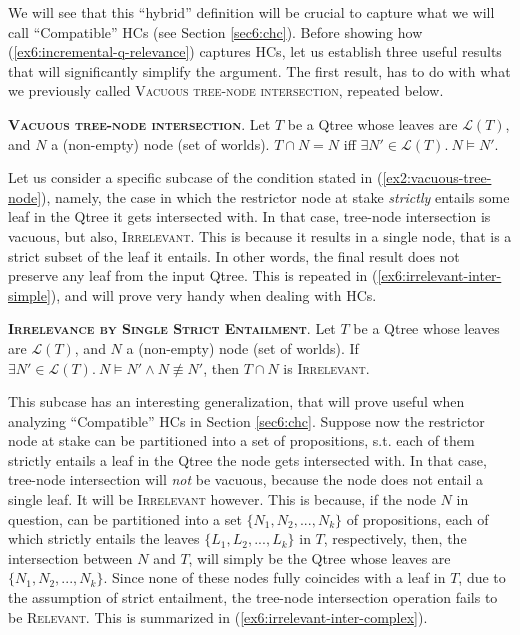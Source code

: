 We will see that this ``hybrid'' definition will be crucial to capture what we will call ``Compatible'' HCs (see Section \ref{sec6:chc}). Before showing how (\ref{ex6:incremental-q-relevance}) captures HCs, let us establish three useful results that will significantly simplify the argument. The first result, has to do with what we previously called \textsc{Vacuous tree-node intersection}, repeated below.

\begin{exe}
	 {\textsc{\textbf{Vacuous tree-node intersection}}. Let $T$ be a Qtree whose leaves are $\mathcal{L}(T)$, and $N$ a (non-empty) node (set of worlds). $T\cap N = N$ iff $\exists N' \in \mathcal{L}(T). \ N \vDash N'$.}
\end{exe}

Let us consider a specific subcase of the condition stated in (\ref{ex2:vacuous-tree-node}), namely, the case in which the restrictor node at stake \textit{strictly} entails some leaf in the Qtree it gets intersected with. In that case, tree-node intersection is vacuous, but also, \textsc{Irrelevant}. This is because it results in a single node, that is a strict subset of the leaf it entails. In other words, the final result does not preserve any leaf from the input Qtree. This is repeated in (\ref{ex6:irrelevant-inter-simple}), and will prove very handy when dealing with HCs.

\begin{exe}
	\ex\label{ex6:irrelevant-inter-simple} {\textsc{\textbf{Irrelevance by Single Strict Entailment}}. Let $T$ be a Qtree whose leaves are $\mathcal{L}(T)$, and $N$ a (non-empty) node (set of worlds). If $\exists N' \in \mathcal{L}(T). \ N \vDash N' \wedge N \not\equiv N'$, then $T\cap N$ is \textsc{Irrelevant}.}
\end{exe}

This subcase has an interesting generalization, that will prove useful when analyzing ``Compatible'' HCs in Section \ref{sec6:chc}. Suppose now the restrictor node at stake can be partitioned into a set of propositions, s.t. each of them strictly entails a leaf in the Qtree the node gets intersected with. In that case, tree-node intersection will \textit{not} be vacuous, because the node does not entail a single leaf. It will be \textsc{Irrelevant} however. This is because, if the node $N$ in question, can be partitioned into a set $\lbrace N_1, N_2, ..., N_k\rbrace$ of propositions, each of which strictly entails the leaves $\lbrace L_1, L_2, ..., L_k\rbrace$ in $T$, respectively, then, the intersection between $N$ and $T$, will simply be the Qtree whose leaves are $\lbrace N_1, N_2, ..., N_k\rbrace$. Since none of these nodes fully coincides with a leaf in $T$, due to the assumption of strict entailment, the tree-node intersection operation fails to be \textsc{Relevant}. This is summarized in (\ref{ex6:irrelevant-inter-complex}).

